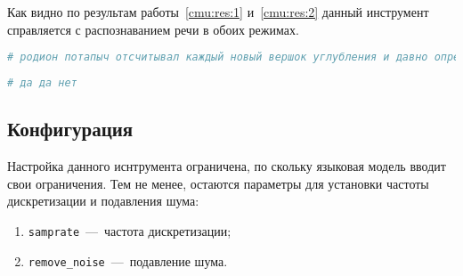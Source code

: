 Как видно по результам работы~\ref{cmu:res:1} и~\ref{cmu:res:2} данный инструмент
справляется с распознаванием речи в обоих режимах.


\begin{lstlisting}[caption={Результат запуска 1 версии},label={cmu:res:1}, language=bash]
# родион потапыч отсчитывал каждый новый вершок углубления и давно определил про себя
\end{lstlisting}

\begin{lstlisting}[caption={Результат запуска 2 версии},label={cmu:res:2},language=bash]
# да да нет
\end{lstlisting}
\subsection{Конфигурация}

Настройка данного иснтрумента ограничена, по скольку языковая модель вводит свои
ограничения. Тем не менее, остаются параметры для установки частоты дискретизации
и подавления шума:
\begin{enumerate}
    \item \texttt{samprate}~---~частота дискретизации;
    \item \texttt{remove\_noise}~---~подавление шума.
\end{enumerate}
